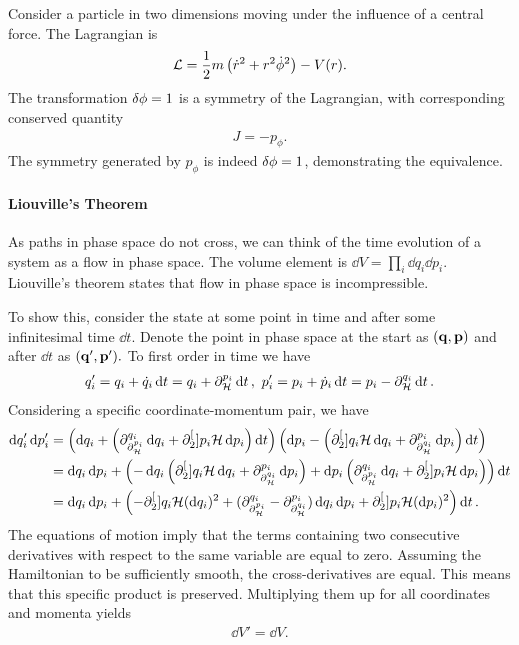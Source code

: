 Consider a particle in two dimensions moving under the influence of a central force. The Lagrangian is
\begin{align*}
	\mathcal{L} = \frac{1}{2}m\left(\dot{r}^{2} + r^{2}\dot{\phi}^{2}\right) - V(r).
\end{align*}
The transformation $\var{\phi} = 1$ is a symmetry of the Lagrangian, with corresponding conserved quantity
\begin{align*}
	J = -p_{\phi}.
\end{align*}
The symmetry generated by $p_{\phi}$ is indeed $\var{\phi} = 1$, demonstrating the equivalence.

\paragraph{Liouville's Theorem}
As paths in phase space do not cross, we can think of the time evolution of a system as a flow in phase space. The volume element is $\dd{V} = \prod\limits_{i}\dd{q_{i}}\dd{p_{i}}$. Liouville's theorem states that flow in phase space is incompressible.

To show this, consider the state at some point in time and after some infinitesimal time $\dd{t}$. Denote the point in phase space at the start as $(\vb{q}, \vb{p})$ and after $\dd{t}$ as $(\vb{q}', \vb{p}').$ To first order in time we have
\begin{align*}
q_{i}' = q_{i} + \dot{q}_{i}\dd{t} = q_{i} + \del{p_{i}}{\ham}\dd{t},\ p_{i}' = p_{i} + \dot{p}_{i}\dd{t} = p_{i} - \del{q_{i}}{\ham}\dd{t}.
\end{align*}
Considering a specific coordinate-momentum pair, we have
\begin{align*}
	\dd{q_{i}'}\dd{p_{i}'} &= \left(\dd{q_{i}} +  \left(\partial^{q_{i}}_{\partial^{p_{i}}_{\mathcal{H}}}\dd{q_{i}} + \partial^{[}_{2}]{p_{i}}{\ensuremath{\mathcal{H}}}\dd{p_{i}}\right)\dd{t}\right)\left(\dd{p_{i}} -  \left(\partial^{[}_{2}]{q_{i}}{\ensuremath{\mathcal{H}}}\dd{q_{i}} + \partial^{p_{i}}_{\partial^{q_{i}}_{\mathcal{H}}}\dd{p_{i}}\right)\dd{t}\right) \\
                           &= \dd{q_{i}}\dd{p_{i}} + \left(-\dd{q_{i}}\left(\partial^{[}_{2}]{q_{i}}{\ensuremath{\mathcal{H}}}\dd{q_{i}} + \partial^{p_{i}}_{\partial^{q_{i}}_{\mathcal{H}}}\dd{p_{i}}\right) + \dd{p_{i}\left(\ensuremath{\partial^{q_{i}}_{\partial^{p_{i}}_{\mathcal{H}}}}\dd{q_{i}} + \ensuremath{\partial^{[}_{2}}]{p_{i}}{\ensuremath{\mathcal{H}}}\dd{p_{i}}\right)}\right)\dd{t} \\
                           &= \dd{q_{i}}\dd{p_{i}} + \left(-\partial^{[}_{2}]{q_{i}}{\ensuremath{\mathcal{H}}}(\dd{q_{i}})^{2} + (\partial^{q_{i}}_{\partial^{p_{i}}_{\mathcal{H}}} - \partial^{p_{i}}_{\partial^{q_{i}}_{\mathcal{H}}})\dd{q_{i}}\dd{p_{i}} + \partial^{[}_{2}]{p_{i}}{\ensuremath{\mathcal{H}}}(\dd{p_{i}})^{2}\right)\dd{t}.
\end{align*}
The equations of motion imply that the terms containing two consecutive derivatives with respect to the same variable are equal to zero. Assuming the Hamiltonian to be sufficiently smooth, the cross-derivatives are equal. This means that this specific product is preserved. Multiplying them up for all coordinates and momenta yields
\begin{align*}
	\dd{V}' = \dd{V}.
\end{align*}

